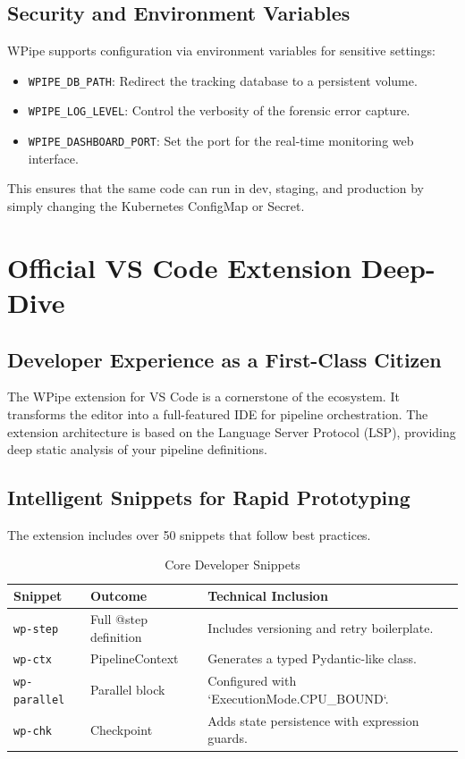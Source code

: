 \documentclass[12pt,a4paper]{report}
\begin{document}
\section{Security and Environment Variables}
WPipe supports configuration via environment variables for sensitive settings:
\begin{itemize}
    \item \texttt{WPIPE\_DB\_PATH}: Redirect the tracking database to a persistent volume.
    \item \texttt{WPIPE\_LOG\_LEVEL}: Control the verbosity of the forensic error capture.
    \item \texttt{WPIPE\_DASHBOARD\_PORT}: Set the port for the real-time monitoring web interface.
\end{itemize}
This ensures that the same code can run in dev, staging, and production by simply changing the Kubernetes ConfigMap or Secret.

\chapter{Official VS Code Extension Deep-Dive}
\cleardoublepage

\section{Developer Experience as a First-Class Citizen}
The WPipe extension for VS Code is a cornerstone of the ecosystem. It transforms the editor into a full-featured IDE for pipeline orchestration. The extension architecture is based on the Language Server Protocol (LSP), providing deep static analysis of your pipeline definitions.

\section{Intelligent Snippets for Rapid Prototyping}
The extension includes over 50 snippets that follow best practices.
\begin{table}[H]
    \centering
    \caption{Core Developer Snippets}
    \begin{tabular}{llp{7cm}}
        \toprule
        \textbf{Snippet} & \textbf{Outcome} & \textbf{Technical Inclusion} \\
        \midrule
        \texttt{wp-step} & Full @step definition & Includes versioning and retry boilerplate. \\
        \texttt{wp-ctx} & PipelineContext & Generates a typed Pydantic-like class. \\
        \texttt{wp-parallel} & Parallel block & Configured with `ExecutionMode.CPU\_BOUND`. \\
        \texttt{wp-chk} & Checkpoint & Adds state persistence with expression guards. \\
        \bottomrule
    \end{tabular}
\end{table}
\end{document}
